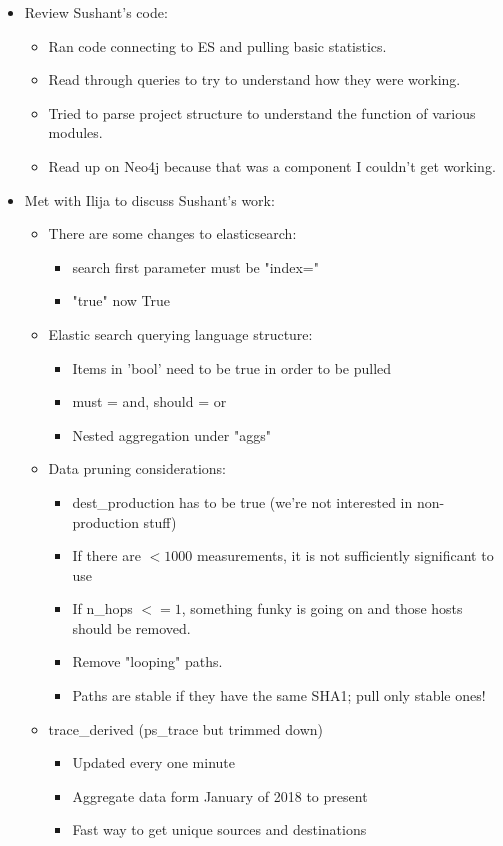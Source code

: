 \documentclass{weeklyreport}
\begin{document}
\begin{itemize}
    \item Review Sushant's code:
    \begin{itemize}
    	\item Ran code connecting to ES and pulling basic statistics.
    	\item Read through queries to try to understand how they were working.
    	\item Tried to parse project structure to understand the function of various modules.
    	\item Read up on Neo4j because that was a component I couldn't get working.
    \end{itemize}
    \item Met with Ilija to discuss Sushant's work:
    \begin{itemize}
    	\item There are some changes to elasticsearch:
    	\begin{itemize}
    		\item search first parameter must be "index="
    		\item "true" now True
    	\end{itemize}
    	\item Elastic search querying language structure:
    	\begin{itemize}
    		\item Items in 'bool' need to be true in order to be pulled
    		\item must = and, should = or
    		\item Nested aggregation under "aggs"
    	\end{itemize}
    	\item Data pruning considerations:
    	\begin{itemize}
    		\item dest\_production has to be true (we're not interested in non-production stuff)
    		\item If there are $<1000$ measurements, it is not sufficiently significant to use
    		\item If n\_hops $<= 1$, something funky is going on and those hosts should be removed.
    		\item Remove "looping" paths.
    		\item Paths are stable if they have the same SHA1; pull only stable ones!
    	\end{itemize}
    	\item trace\_derived (ps\_trace but trimmed down)
    	\begin{itemize}
    		\item Updated every one minute
    		\item Aggregate data form January of 2018 to present
	    	\item Fast way to get unique sources and destinations		
		\end{itemize}    	 
    	

\end{itemize}
\end{itemize}
\end{document}
